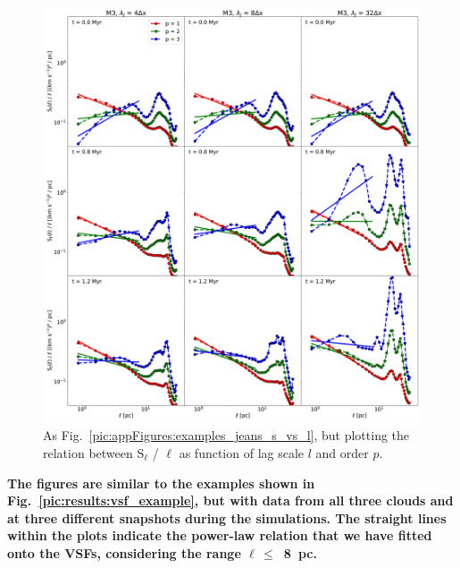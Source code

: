  	
\begin{figure}
    \centering
    \includegraphics[width=\textwidth]{app_examples_jeans_sl_l.pdf}
    \caption{
        As Fig.~\ref{pic:appFigures:examples_jeans_s_vs_l}, but plotting the relation between S$_{\ell}$ / $\ell$ as function of lag scale $l$ and order $p$.
    }
    \label{pic:appFigures:examples_jeans_sl_vs_l}
\end{figure}


\textbf{
    The figures are similar to the examples shown in Fig.~\ref{pic:results:vsf_example}, but with data from all three clouds and at three different snapshots during the simulations.
    The straight lines within the plots indicate the power-law relation that we have fitted onto the VSFs, considering the range $\ell\,\leq$~8~pc.
}

